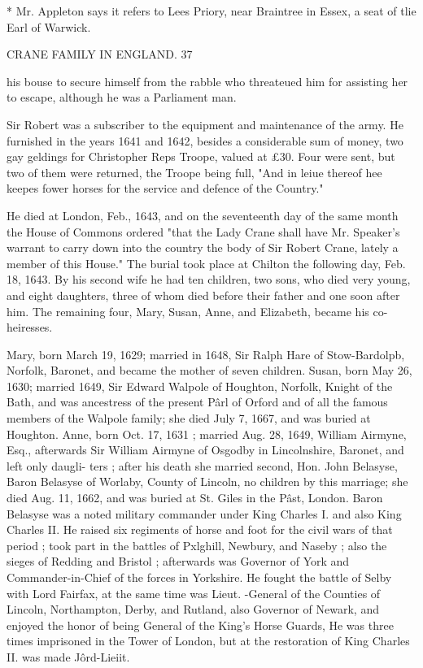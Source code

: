 \documentclass{book}
\begin{document}
* Mr. Appleton says it refers to Lees Priory, near Braintree in Essex, 
a seat of tlie Earl of Warwick. 



CRANE FAMILY IN ENGLAND. 37 

his bouse to secure himself from the rabble who threateued him 
for assisting her to escape, although he was a Parliament man. 

Sir Robert was a subscriber to the equipment and maintenance 
of the army. He furnished in the years 1641 and 1642, besides 
a considerable sum of money, two gay geldings for Christopher 
Reps Troope, valued at £30. Four were sent, but two of them 
were returned, the Troope being full, "And in leiue thereof hee 
keepes fower horses for the service and defence of the Country." 

He died at London, Feb., 1643, and on the seventeenth day of 
the same month the House of Commons ordered "that the Lady 
Crane shall have Mr. Speaker's warrant to carry down into the 
country the body of Sir Robert Crane, lately a member of this 
House." The burial took place at Chilton the following day, 
Feb. 18, 1643. By his second wife he had ten children, two 
sons, who died very young, and eight daughters, three of whom 
died before their father and one soon after him. The remaining 
four, Mary, Susan, Anne, and Elizabeth, became his co-heiresses. 

Mary, born March 19, 1629; married in 1648, Sir Ralph Hare 
of Stow-Bardolpb, Norfolk, Baronet, and became the mother of 
seven children. Susan, born May 26, 1630; married 1649, Sir 
Edward Walpole of Houghton, Norfolk, Knight of the Bath, and 
was ancestress of the present P\^arl of Orford and of all the famous 
members of the Walpole family; she died July 7, 1667, and 
was buried at Houghton. Anne, born Oct. 17, 1631 ; married 
Aug. 28, 1649, William Airmyne, Esq., afterwards Sir William 
Airmyne of Osgodby in Lincolnshire, Baronet, and left only daugli- 
ters ; after his death she married second, Hon. John Belasyse, 
Baron Belasyse of Worlaby, County of Lincoln, no children by 
this marriage; she died Aug. 11, 1662, and was buried at St. 
Giles in the P\^ast, London. Baron Belasyse was a noted military 
commander under King Charles I. and also King Charles II. 
He raised six regiments of horse and foot for the civil wars of 
that period ; took part in the battles of Pxlghill, Newbury, and 
Naseby ; also the sieges of Redding and Bristol ; afterwards was 
Governor of York and Commander-in-Chief of the forces in 
Yorkshire. He fought the battle of Selby with Lord Fairfax, at 
the same time was Lieut. -General of the Counties of Lincoln, 
Northampton, Derby, and Rutland, also Governor of Newark, 
and enjoyed the honor of being General of the King's Horse 
Guards, He was three times imprisoned in the Tower of London, 
but at the restoration of King Charles II. was made J\^ord-Lieiit. 
\end{document}
